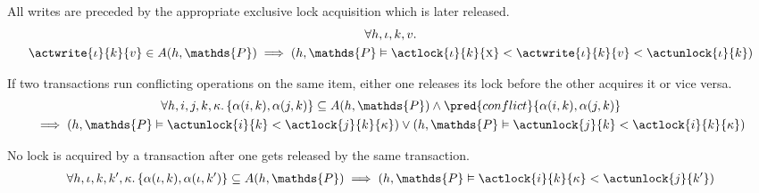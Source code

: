 \lem All writes are preceded by the appropriate exclusive lock acquisition which is later released.
\begin{gather*}
\forall h, \iota, k, v \ldotp \\
\actwrite{\iota}{k}{v} \in A(h, \mathds{P}) \implies \left( h, \mathds{P} \vDash \actlock{\iota}{k}{\textsc{x}} < \actwrite{\iota}{k}{v} < \actunlock{\iota}{k} \right)
\end{gather*}

\lem If two transactions run conflicting operations on the same item, either one releases its lock before the other acquires it or vice versa.
\begin{gather*}
\forall h, i, j, k, \kappa \ldotp 
\{ \alpha(i, k), \alpha(j, k) \} \subseteq A(h, \mathds{P}) \land \pred{conflict}{\alpha(i, k), \alpha(j, k)} 
\\
\implies \left( h, \mathds{P} \vDash \actunlock{i}{k} < \actlock{j}{k}{\kappa} \right) \lor \left( h, \mathds{P} \vDash \actunlock{j}{k} < \actlock{i}{k}{\kappa} \right)
\end{gather*}

\lem No lock is acquired by a transaction after one gets released by the same transaction.
\begin{gather*}
\forall h, \iota, k, k', \kappa \ldotp 
\{ \alpha(\iota, k), \alpha(\iota, k') \} \subseteq A(h, \mathds{P})
\implies \left( h, \mathds{P} \vDash \actlock{i}{k}{\kappa} < \actunlock{j}{k'} \right)
\end{gather*}